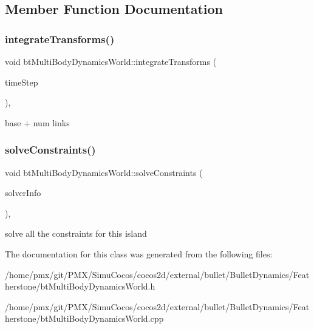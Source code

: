 \subsection{Member Function Documentation}
\mbox{\label{classbtMultiBodyDynamicsWorld_a6abe9896c6178b8d5bebdbca53fa7a74}} 
\subsubsection{\texorpdfstring{integrate\+Transforms()}{integrateTransforms()}}
{\footnotesize\ttfamily void bt\+Multi\+Body\+Dynamics\+World\+::integrate\+Transforms (\begin{DoxyParamCaption}\item[{bt\+Scalar}]{time\+Step }\end{DoxyParamCaption})\hspace{0.3cm}{\ttfamily [protected]}, {\ttfamily [virtual]}}

base + num links \mbox{\label{classbtMultiBodyDynamicsWorld_a96ca0256c11525090a831cc854fe0750}} 
\subsubsection{\texorpdfstring{solve\+Constraints()}{solveConstraints()}}
{\footnotesize\ttfamily void bt\+Multi\+Body\+Dynamics\+World\+::solve\+Constraints (\begin{DoxyParamCaption}\item[{\hyperlink{structbtContactSolverInfo}{bt\+Contact\+Solver\+Info} \&}]{solver\+Info }\end{DoxyParamCaption})\hspace{0.3cm}{\ttfamily [protected]}, {\ttfamily [virtual]}}

solve all the constraints for this island 

The documentation for this class was generated from the following files\+:\begin{DoxyCompactItemize}
\item 
/home/pmx/git/\+P\+M\+X/\+Simu\+Cocos/cocos2d/external/bullet/\+Bullet\+Dynamics/\+Featherstone/bt\+Multi\+Body\+Dynamics\+World.\+h\item 
/home/pmx/git/\+P\+M\+X/\+Simu\+Cocos/cocos2d/external/bullet/\+Bullet\+Dynamics/\+Featherstone/bt\+Multi\+Body\+Dynamics\+World.\+cpp\end{DoxyCompactItemize}
